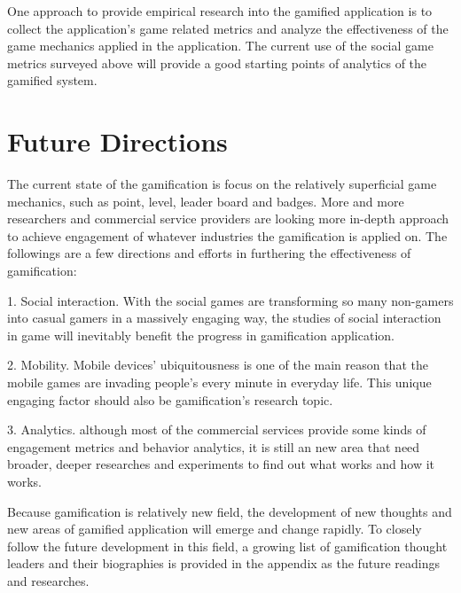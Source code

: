 One approach to provide empirical research into the gamified application is to collect the application's game related metrics and analyze the effectiveness of the game mechanics applied in the application. The current use of the social game metrics surveyed above will provide a good starting points of analytics of the gamified system.

\section {Future Directions}

The current state of the gamification is focus on the relatively superficial game mechanics, such as point, level, leader board and badges. More and more researchers and commercial service providers are looking more in-depth approach to achieve engagement of whatever industries the gamification is applied on. The followings are a few directions and efforts in furthering the effectiveness of gamification:

1. Social interaction.  With the social games are transforming so many non-gamers into casual gamers in a massively engaging way, the studies of social interaction in game will inevitably benefit the progress in gamification application.

2. Mobility. Mobile devices' ubiquitousness is one of the main reason that the mobile games are invading people's every minute in everyday life. This unique engaging factor should also be gamification's research topic. 

3. Analytics. although most of the commercial services provide some kinds of engagement metrics and behavior analytics, it is still an new area that need broader, deeper researches and experiments to find out what works and how it works. 


Because gamification is relatively new field, the development of new thoughts and new areas of gamified application will emerge and change rapidly. To closely follow the future development in this field, a growing list of gamification thought leaders and their biographies is provided in the appendix as the future readings and researches.
